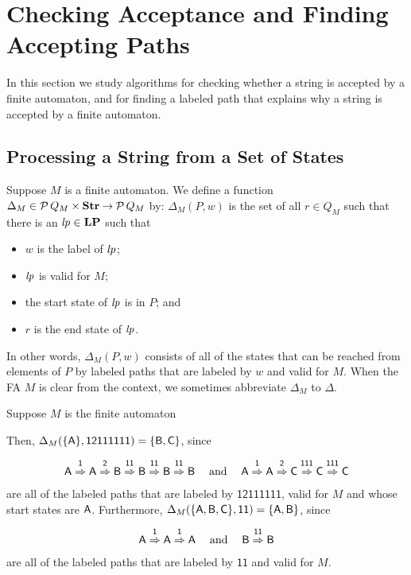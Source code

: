 \section{Checking Acceptance and Finding Accepting Paths}
\label{CheckingAcceptanceAndFindingAcceptingPaths}

In this section we study algorithms for checking whether a string is
%
%
accepted by a finite automaton, and for finding a labeled path that
explains why a string is accepted by a finite automaton.

\subsection{Processing a String from a Set of States}

Suppose $M$ is a finite automaton.  We define a function
$\Delta_M\in{\cal P} \,Q_M\times\mathbf{Str}\mathbin{\to}{\cal P} \,Q_M$ by:
%
%
$\Delta_M(P,w)$ is the set of all $r\in Q_M$ such that there is
an ${\it lp}\in\mathbf{LP}$ such that
\begin{itemize}
\item $w$ is the label of ${\it lp}$;

\item ${\it lp}$ is valid for $M$;

\item the start state of ${\it lp}$ is in $P$; and

\item $r$ is the end state of ${\it lp}$.
\end{itemize}
In other words, $\Delta_M(P,w)$ consists of all of the states that can
be reached from elements of $P$ by labeled paths that are labeled by
$w$ and valid for $M$.  When the FA $M$ is clear from the context, we
sometimes abbreviate $\Delta_M$ to $\Delta$.

Suppose $M$ is the finite automaton
\begin{center}

\end{center}
Then, $\Delta_M(\{\mathsf{A}\},\mathsf{12111111}) =
\{\mathsf{B},\mathsf{C}\}$, since
\begin{gather*}
\mathsf{A\stackrel{\strut1}{\Rightarrow}A\stackrel{\strut2}{\Rightarrow}B\stackrel{\strut11}{\Rightarrow}B\stackrel{\strut11}{\Rightarrow}B\stackrel{\strut11}{\Rightarrow}B}
\quad\;\allowbreak\mbox{and}\allowbreak\;\quad
\mathsf{A\stackrel{\strut1}{\Rightarrow}A\stackrel{\strut2}{\Rightarrow}C\stackrel{\strut111}{\Rightarrow}C\stackrel{\strut111}{\Rightarrow}C}
\end{gather*}
are all of the labeled paths that are labeled by $\mathsf{12111111}$,
valid for $M$ and whose start states are $\mathsf{A}$.
Furthermore, $\Delta_M(\{\mathsf{A},\mathsf{B},\mathsf{C}\},\mathsf{11}) =
\{\mathsf{A},\mathsf{B}\}$, since
\begin{gather*}
\mathsf{A\stackrel{\strut1}{\Rightarrow}A\stackrel{\strut1}{\Rightarrow}A}
\quad\;\allowbreak\mbox{and}\allowbreak\;\quad
\mathsf{B\stackrel{\strut11}{\Rightarrow}B}
\end{gather*}
are all of the labeled paths that are labeled by $\mathsf{11}$ and
valid for $M$.

